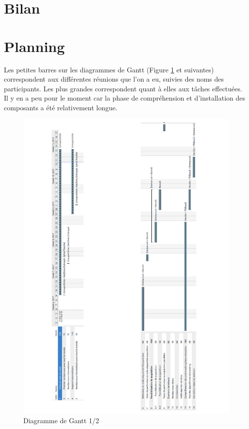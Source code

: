 \documentclass{article}
\begin{document}


\section{Bilan}





\section{Planning}

Les petites barres sur les diagrammes de Gantt (Figure \ref{gantt} et suivantes) correspondent aux différentes réunions que l'on a eu, suivies des noms des participants. Les plus grandes correspondent quant à elles aux tâches effectuées. Il y en a peu pour le moment car la phase de compréhension et d'installation des composants a été relativement longue.

\newpage
\begin{figure}
	\begin{center}
		\includegraphics[scale=0.3]{Modules/Picture/gantt_0_1}
		\caption{Diagramme de Gantt 1/2}
		\label{gantt}
	\end{center}
\end{figure}
\end{document}
